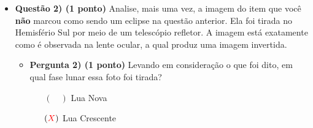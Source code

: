 \documentclass[a4paper, 12pt]{article}
\begin{document}
\begin{flushleft}
\begin{itemize}
\begin{itemize}
\begin{multicols}{2}
\begin{figure}[H]
							\captionsetup{labelformat=empty}
							\caption{\textcolor{red}{(b)}}
						\end{figure}
					\end{multicols}
					\textcolor{red}{Perceba que, no item b, a parte escura está com um formato arredondado, o que só ocorre em eclipses. Inclusive, foi assim que, há muito tempo, Aristóteles sugeriu que a Terra devia ser redonda devido a sua sombra projetada na Lua.}
				\item \textbf{Pergunta 1b) (0.25 ponto)} Que tipo de eclipse é mostrado?
					\begin{itemize}
						\item[$(\textcolor{red}{X})$] Eclipse lunar
						\item[$(\quad)$] Eclipse solar
					\end{itemize}
					\textcolor{red}{A sombra da Terra está sendo projetada na Lua, então é um eclipse lunar. Só seria um eclipse solar caso a sombra do Sol estivesse sendo projetada na Terra.}
				\item \textbf{Pergunta 1c) (0.25 ponto)} Em qual fase lunar esse eclipse aconteceu?
					\begin{itemize}
						\item[$(\quad)$] Lua Nova
						\item[$(\quad)$] Lua Crescente
						\item[$(\textcolor{red}{X})$] Lua Cheia
						\item[$(\quad)$] Lua Minguante
					\end{itemize}
					\textcolor{red}{Eclipses lunares só podem ocorrer quando está Cheia, pois é preciso o alinhamento Sol-Terra-Lua. De modo análogo, eclipses solares só acontecem na Lua Nova, quando o alinhamento é Sol-Lua-Terra.}
			\end{itemize}
		\item \textbf{Questão 2) (1 ponto)} Analise, mais uma vez, a imagem do item que você \textbf{não} marcou como sendo um eclipse na questão anterior. Ela foi tirada no Hemisfério Sul por meio de um telescópio refletor. A imagem está exatamente como é observada na lente ocular, a qual produz uma imagem invertida.
			\begin{itemize}
				\item \textbf{Pergunta 2) (1 ponto)} Levando em consideração o que foi dito, em qual fase lunar essa foto foi tirada?
					\begin{itemize}
						\item[$(\quad)$] Lua Nova
						\item[$(\textcolor{red}{X})$] Lua Crescente

\end{itemize}
\end{itemize}
\end{itemize}
\end{flushleft}
\end{document}

